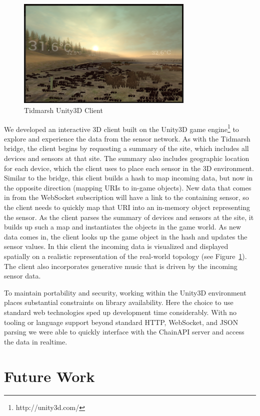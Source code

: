\documentclass{acm_proc_article-sp}
\begin{document}
\begin{figure}
    \centering
    \includegraphics[width=8.45cm]{tidmarsh_screenshot}
    \caption{Tidmarsh Unity3D Client}
    \label{tidmarsh_screenshot}
\end{figure}

We developed an interactive 3D client built on the Unity3D game
engine\footnote{http://unity3d.com/} to explore and experience the data from
the sensor network. As with the Tidmarsh bridge, the client begins by
requesting a summary of the site, which includes all devices and sensors at
that site. The summary also includes geographic location for each device, which
the client uses to place each sensor in the 3D environment. Similar to the
bridge, this client builds a hash to map incoming data, but now in the opposite
direction (mapping URIs to in-game objects). New data that comes in from the
WebSocket subscription will have a link to the containing sensor, so the client
needs to quickly map that URI into an in-memory object representing the sensor.
As the client parses the summary of devices and sensors at the site, it builds
up such a map and instantiates the objects in the game world. As new data comes
in, the client looks up the game object in the hash and updates the sensor
values. In this client the incoming data is visualized and displayed spatially
on a realistic representation of the real-world topology (see
Figure~\ref{tidmarsh_screenshot}). The client also incorporates generative
music that is driven by the incoming sensor data.

To maintain portability and security, working within the Unity3D environment
places substantial constraints on library availability. Here the choice to use
standard web technologies sped up development time considerably. With no
tooling or language support beyond standard HTTP, WebSocket, and JSON parsing
we were able to quickly interface with the ChainAPI server and access the data
in realtime.

\section{Future Work}
\end{document}
